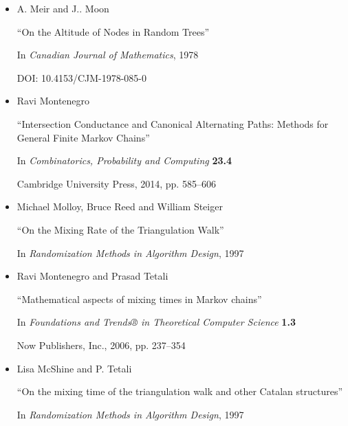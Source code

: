\documentclass[10pt,a4paper]{article}
\begin{document}
\begin{itemize}
“Faster Mixing via Average Conductance”

In \emph{Proceedings of the Thirty-First Annual ACM Symposium on Theory of Computing}, STOC ’99

Atlanta, Georgia, USA: Association for Computing Machinery, 1999, pp. 282–287

DOI: 10.1145/301250.301317


      

\item[] [MM78]
A. Meir and J.. Moon

“On the Altitude of Nodes in Random Trees”

In \emph{Canadian Journal of Mathematics}, 1978

DOI: 10.4153/CJM-1978-085-0


      

\item[] [Mon14]
Ravi Montenegro

“Intersection Conductance and Canonical Alternating Paths: Methods for General Finite Markov Chains”

In \emph{Combinatorics, Probability and Computing} \textbf{23.4}

Cambridge University Press, 2014, pp. 585–606


      

\item[] [MRS97]
Michael Molloy, Bruce Reed and William Steiger

“On the Mixing Rate of the Triangulation Walk”

In \emph{Randomization Methods in Algorithm Design}, 1997


      

\item[] [MT06]
Ravi Montenegro and Prasad Tetali

“Mathematical aspects of mixing times in Markov chains”

In \emph{Foundations and Trends® in Theoretical Computer Science} \textbf{1.3}

Now Publishers, Inc., 2006, pp. 237–354


      

\item[] [MT97]
Lisa McShine and P. Tetali

“On the mixing time of the triangulation walk and other Catalan structures”

In \emph{Randomization Methods in Algorithm Design}, 1997


      


\end{itemize}
\end{document}
